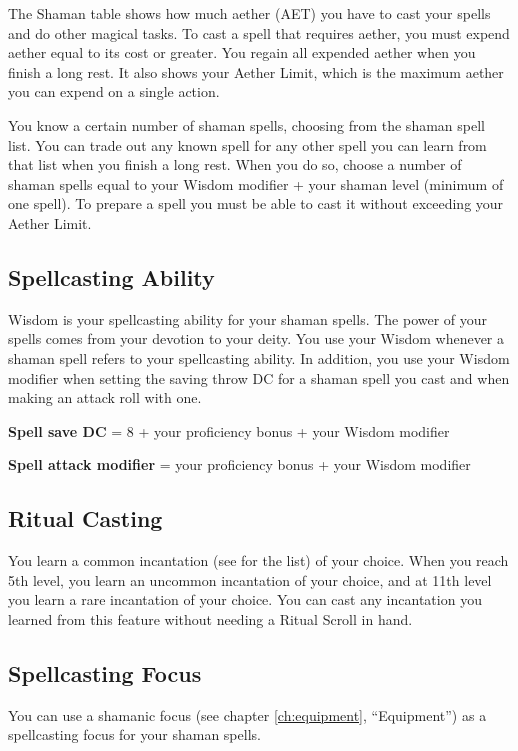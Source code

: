 The Shaman table shows how much aether (AET) you have to cast your spells and do other magical tasks. To cast a spell that requires aether, you must expend aether equal to its cost or greater. You regain all expended aether when you finish a long rest. It also shows your Aether Limit, which is the maximum aether you can expend on a single action.

You know a certain number of shaman spells, choosing from the shaman spell list. You can trade out any known spell for any other spell you can learn from that list when you finish a long rest. When you do so, choose a number of shaman spells equal to your Wisdom modifier + your shaman level (minimum of one spell). To prepare a spell you must be able to cast it without exceeding your Aether Limit.

\subsection{Spellcasting Ability}

Wisdom is your spellcasting ability for your shaman spells. The power of your spells comes from your devotion to your deity. You use your Wisdom whenever a shaman spell refers to your spellcasting ability. In addition, you use your Wisdom modifier when setting the saving throw DC for a shaman spell you cast and when making an attack roll with one.

\textbf{Spell save DC} = 8 + your proficiency bonus + your Wisdom modifier

\textbf{Spell attack modifier} = your proficiency bonus + your Wisdom modifier

\subsection{Ritual Casting}

You learn a common incantation (see  for the list) of your choice. When you reach 5th level, you learn an uncommon incantation of your choice, and at 11th level you learn a rare incantation of your choice. You can cast any incantation you learned from this feature without needing a Ritual Scroll in hand.

\subsection{Spellcasting Focus}

You can use a shamanic focus (see chapter \ref{ch:equipment}, “Equipment”) as a spellcasting focus for your shaman spells.

